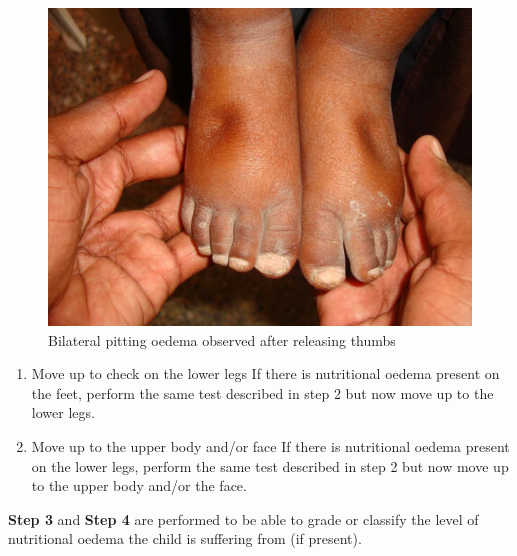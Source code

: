 \documentclass[12pt,]{book}
\theoremstyle{definition}
\theoremstyle{definition}
\theoremstyle{definition}
\theoremstyle{remark}
\begin{document}
\begin{figure}

{\centering \includegraphics{images/oedemaStep2} 

}

\caption{Bilateral pitting oedema observed after releasing thumbs}\label{fig:oedemaStep2}
\end{figure}

\begin{enumerate}
\def\labelenumi{\arabic{enumi}.}
\setcounter{enumi}{2}
\item
  Move up to check on the lower legs If there is nutritional oedema
  present on the feet, perform the same test described in step 2 but now
  move up to the lower legs.
\item
  Move up to the upper body and/or face If there is nutritional oedema
  present on the lower legs, perform the same test described in step 2
  but now move up to the upper body and/or the face.
\end{enumerate}

\textbf{Step 3} and \textbf{Step 4} are performed to be able to grade or
classify the level of nutritional oedema the child is suffering from (if
present).
\end{document}
